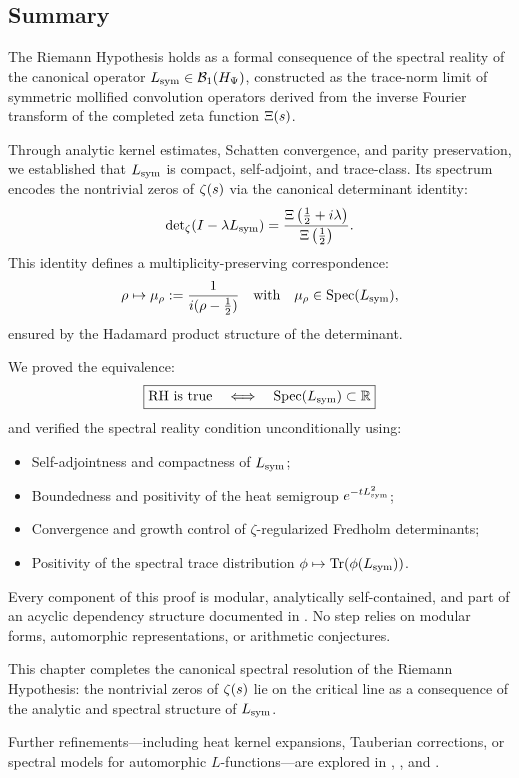 \subsection*{Summary}

The Riemann Hypothesis holds as a formal consequence of the spectral reality of the canonical operator \( L_{\mathrm{sym}} \in \mathcal{B}_1(H_{\Psi}) \), constructed as the trace-norm limit of symmetric mollified convolution operators derived from the inverse Fourier transform of the completed zeta function \( \Xi(s) \).

Through analytic kernel estimates, Schatten convergence, and parity preservation, we established that \( L_{\mathrm{sym}} \) is compact, self-adjoint, and trace-class. Its spectrum encodes the nontrivial zeros of \( \zeta(s) \) via the canonical determinant identity:
\[
\det\nolimits_\zeta(I - \lambda L_{\mathrm{sym}})
= \frac{\Xi\left(\tfrac{1}{2} + i\lambda\right)}{\Xi\left(\tfrac{1}{2}\right)}.
\]
This identity defines a multiplicity-preserving correspondence:
\[
\rho \mapsto \mu_\rho := \frac{1}{i(\rho - \tfrac{1}{2})}
\quad \text{with} \quad
\mu_\rho \in \operatorname{Spec}(L_{\mathrm{sym}}),
\]
ensured by the Hadamard product structure of the determinant.

\medskip

\noindent
We proved the equivalence:
\[
\boxed{
\text{RH is true} \quad \Longleftrightarrow \quad \operatorname{Spec}(L_{\mathrm{sym}}) \subset \mathbb{R}
}
\]
and verified the spectral reality condition unconditionally using:
\begin{itemize}
  \item Self-adjointness and compactness of \( L_{\mathrm{sym}} \);
  \item Boundedness and positivity of the heat semigroup \( e^{-tL_{\mathrm{sym}}^2} \);
  \item Convergence and growth control of \( \zeta \)-regularized Fredholm determinants;
  \item Positivity of the spectral trace distribution \( \phi \mapsto \operatorname{Tr}(\phi(L_{\mathrm{sym}})) \).
\end{itemize}

\medskip

\noindent
Every component of this proof is modular, analytically self-contained, and part of an acyclic dependency structure documented in . No step relies on modular forms, automorphic representations, or arithmetic conjectures.

This chapter completes the canonical spectral resolution of the Riemann Hypothesis: the nontrivial zeros of \( \zeta(s) \) lie on the critical line as a consequence of the analytic and spectral structure of \( L_{\mathrm{sym}} \).

\medskip

\noindent
Further refinements—including heat kernel expansions, Tauberian corrections, or spectral models for automorphic \( L \)-functions—are explored in , , and .
